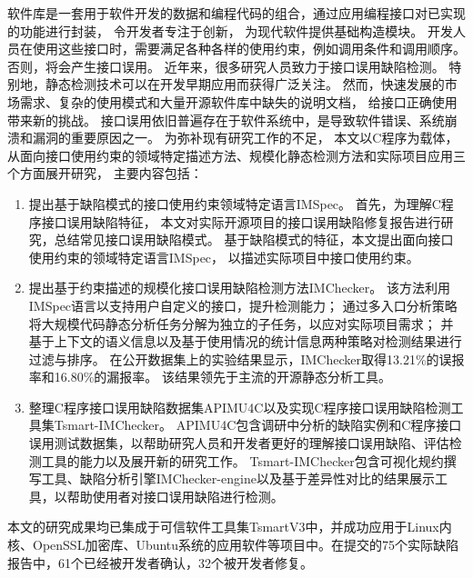 \begin{cabstract}
  软件库是一套用于软件开发的数据和编程代码的组合，通过应用编程接口对已实现的功能进行封装，
  令开发者专注于创新，
  为现代软件提供基础构造模块。
  开发人员在使用这些接口时，需要满足各种各样的使用约束，例如调用条件和调用顺序。
  否则，将会产生接口误用。
  近年来，很多研究人员致力于接口误用缺陷检测。
  特别地，静态检测技术可以在开发早期应用而获得广泛关注。
  然而，快速发展的市场需求、复杂的使用模式和大量开源软件库中缺失的说明文档，
  给接口正确使用带来新的挑战。
  接口误用依旧普遍存在于软件系统中，是导致软件错误、系统崩溃和漏洞的重要原因之一。
  为弥补现有研究工作的不足，
  本文以C程序为载体，从面向接口使用约束的领域特定描述方法、规模化静态检测方法和实际项目应用三个方面展开研究，
  主要内容包括：
  \begin{enumerate}
  	\item 提出基于缺陷模式的接口使用约束领域特定语言IMSpec。
  	首先，为理解C程序接口误用缺陷特征，
  	本文对实际开源项目的接口误用缺陷修复报告进行研究，总结常见接口误用缺陷模式。
  	基于缺陷模式的特征，本文提出面向接口使用约束的领域特定语言IMSpec，
  	以描述实际项目中接口使用约束。
  	\item 提出基于约束描述的规模化接口误用缺陷检测方法IMChecker。
  	该方法利用IMSpec语言以支持用户自定义的接口，提升检测能力；
  	通过多入口分析策略将大规模代码静态分析任务分解为独立的子任务，以应对实际项目需求；
  	并基于上下文的语义信息以及基于使用情况的统计信息两种策略对检测结果进行过滤与排序。
  	在公开数据集上的实验结果显示，IMChecker取得13.21\%的误报率和16.80\%的漏报率。
  	该结果领先于主流的开源静态分析工具。
  	\item 整理C程序接口误用缺陷数据集APIMU4C以及实现C程序接口误用缺陷检测工具集Tsmart-IMChecker。
  	APIMU4C包含调研中分析的缺陷实例和C程序接口误用测试数据集，以帮助研究人员和开发者更好的理解接口误用缺陷、评估检测工具的能力以及展开新的研究工作。
  	Tsmart-IMChecker包含可视化规约撰写工具、缺陷分析引擎IMChecker-engine以及基于差异性对比的结果展示工具，以帮助使用者对接口误用缺陷进行检测。
  \end{enumerate}
  
  本文的研究成果均已集成于可信软件工具集TsmartV3中，并成功应用于Linux内核、OpenSSL加密库、Ubuntu系统的应用软件等项目中。在提交的75个实际缺陷报告中，61个已经被开发者确认，32个被开发者修复。
  
\end{cabstract}


